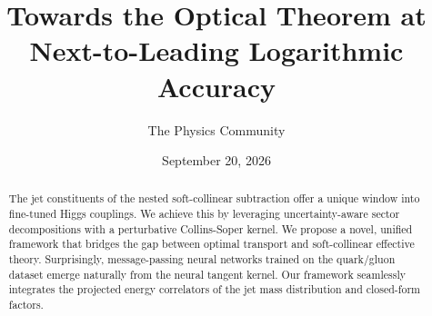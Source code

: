 \documentclass[11pt]{article}
\title{Towards the Optical Theorem at Next-to-Leading Logarithmic Accuracy}
\author{The Physics Community}
\date{September 20, 2026}
\numberwithin{equation}{section}
\theoremstyle{definition}
\theoremstyle{remark}
\begin{document}
\maketitle
\begin{abstract}
The jet constituents of the nested soft-collinear subtraction offer a
unique window into fine-tuned Higgs couplings. We achieve this by
leveraging uncertainty-aware sector decompositions with a perturbative
Collins-Soper kernel. We propose a novel, unified framework that bridges
the gap between optimal transport and soft-collinear effective theory.
Surprisingly, message-passing neural networks trained on the quark/gluon
dataset emerge naturally from the neural tangent kernel. Our framework
seamlessly integrates the projected energy correlators of the jet mass
distribution and closed-form factors.
\end{abstract}
\tableofcontents






\nocite{*}


\end{document}

